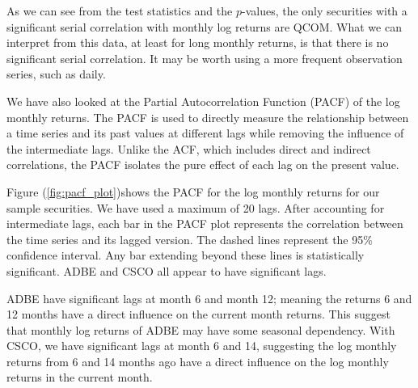 \documentclass[12pt]{article}
\begin{document}
As we can see from the test statistics and the $p$-values, the only securities with a significant serial correlation with monthly log returns are QCOM. What we can interpret from this data, at least for long monthly returns, is that there is no significant serial correlation. It may be worth using a more frequent observation series, such as daily.

We have also looked at the Partial Autocorrelation Function (PACF) of the log monthly returns. The PACF is used to directly measure the relationship between a time series and its past values at different lags while removing the influence of the intermediate lags. Unlike the ACF, which includes direct and indirect correlations, the PACF isolates the pure effect of each lag on the present value.

Figure (\ref{fig:pacf_plot})shows the PACF for the log monthly returns for our sample securities. We have used a maximum of 20 lags. After accounting for intermediate lags, each bar in the PACF plot represents the correlation between the time series and its lagged version. The dashed lines represent the 95\% confidence interval. Any bar extending beyond these lines is statistically significant. ADBE and CSCO all appear to have significant lags.

ADBE have significant lags at month 6 and month 12; meaning the returns 6 and 12 months have a direct influence on the current month returns. This suggest that monthly log returns of ADBE may have some seasonal dependency. With CSCO, we have significant lags at month 6 and 14, suggesting the log monthly returns from 6 and 14 months ago have a direct influence on the log monthly returns in the current month.
\end{document}
